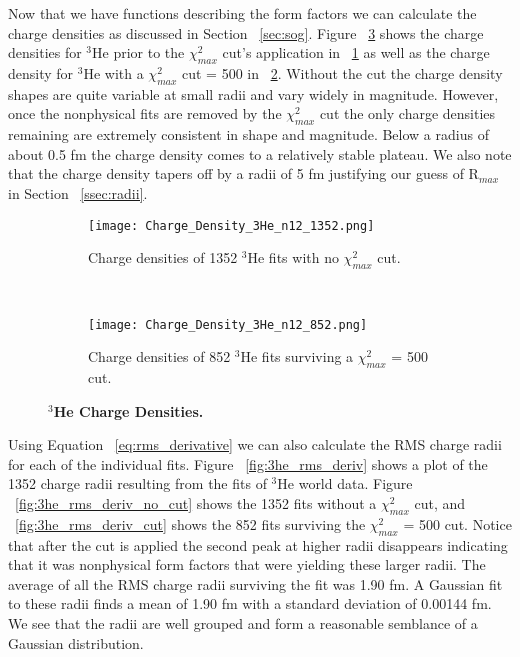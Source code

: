 Now that we have functions describing the form factors we can calculate the charge densities as discussed in Section ~\ref{sec:sog}. Figure ~\ref{fig:3he_charge_density} shows the charge densities for $^3$He prior to the $\chi^2_{max}$ cut's application in ~\ref{fig:3he_charge_density_no_cut} as well as the charge density for $^3$He with a $\chi^2_{max}$ cut = 500 in ~\ref{fig:3he_charge_density_cut}. Without the cut the charge density shapes are quite variable at small radii and vary widely in magnitude. However, once the nonphysical fits are removed by the $\chi^2_{max}$ cut the only charge densities remaining are extremely consistent in shape and magnitude. Below a radius of about 0.5 fm the charge density comes to a relatively stable plateau. We also note that the charge density tapers off by a radii of 5 fm justifying our guess of R$_{max}$ in Section ~\ref{ssec:radii}. %

\begin{figure}[!ht]
\begin{subfigure}{1.\textwidth}
  \centering
  \texttt{[image: Charge\_Density\_3He\_n12\_1352.png]}
  \caption{Charge densities of 1352 $^3$He fits with no $\chi^2_{max}$ cut.}
  \label{fig:3he_charge_density_no_cut}
\end{subfigure}\\
\begin{subfigure}{1.\textwidth}
  \centering
  \texttt{[image: Charge\_Density\_3He\_n12\_852.png]}
  \caption{Charge densities of 852 $^3$He fits surviving a $\chi^2_{max}$ = 500 cut.}
  \label{fig:3he_charge_density_cut}
\end{subfigure}
\caption{\bf{$^3$He Charge Densities.}}
\label{fig:3he_charge_density}
\end{figure}

Using Equation ~\ref{eq:rms_derivative} we can also calculate the RMS charge radii for each of the individual fits. Figure ~\ref{fig:3he_rms_deriv} shows a plot of the 1352 charge radii resulting from the fits of $^3$He world data. Figure ~\ref{fig:3he_rms_deriv_no_cut} shows the 1352 fits without a $\chi^2_{max}$ cut, and ~\ref{fig:3he_rms_deriv_cut} shows the 852 fits surviving the $\chi^2_{max}$ = 500 cut. Notice that after the cut is applied the second peak at higher radii disappears indicating that it was nonphysical form factors that were yielding these larger radii. The average of all the RMS charge radii surviving the fit was 1.90 fm. A Gaussian fit to these radii finds a mean of 1.90 fm with a standard deviation of 0.00144 fm. We see that the radii are well grouped and form a reasonable semblance of a Gaussian distribution. %

